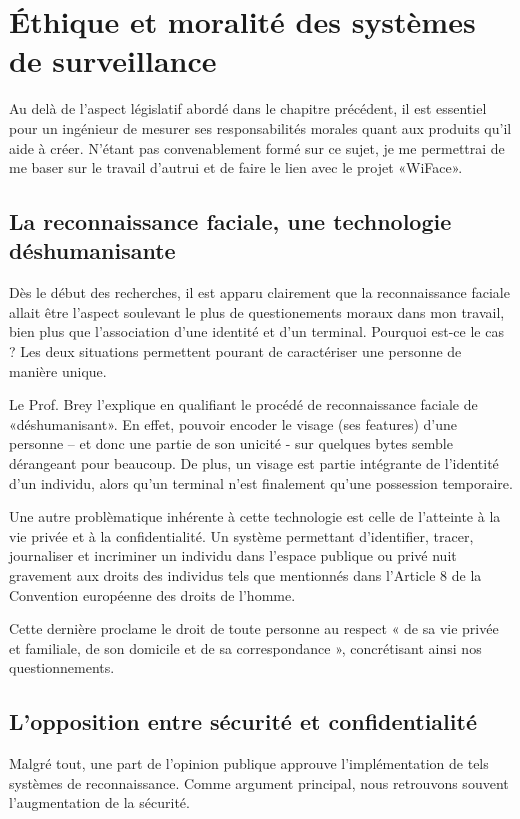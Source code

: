 \chapter{Éthique et moralité des systèmes de surveillance}
\label{ch:etudemoralite}

Au delà de l’aspect législatif abordé dans le chapitre précédent, il est essentiel pour un ingénieur de mesurer ses
responsabilités morales quant aux produits qu’il aide à créer. N’étant pas convenablement formé sur ce sujet, je
me permettrai de me baser sur le travail d’autrui et de faire le lien avec le projet «WiFace».

\section{La reconnaissance faciale, une technologie déshumanisante}
Dès le début des recherches, il est apparu clairement que la reconnaissance faciale allait être l’aspect soulevant le
plus de questionements moraux dans mon travail, bien plus que l’association d’une identité et d’un terminal.
Pourquoi est-ce le cas ? Les deux situations permettent pourant de caractériser une personne de manière unique.

Le Prof. Brey l’explique en qualifiant le procédé de reconnaissance faciale de «déshumanisant». En effet, pouvoir
encoder le visage (ses features) d’une personne – et donc une partie de son unicité - sur quelques bytes semble
dérangeant pour beaucoup. De plus, un visage est partie intégrante de l’identité d’un individu, alors qu’un terminal
n’est finalement qu’une possession temporaire.

Une autre problèmatique inhérente à cette technologie est celle de l’atteinte à la vie privée et à la confidentialité.
Un système permettant d’identifier, tracer, journaliser et incriminer un individu dans l’espace publique ou privé
nuit gravement aux droits des individus tels que mentionnés dans l’Article 8 de la Convention européenne des droits
de l’homme.

Cette dernière proclame le droit de toute personne au respect « de sa vie privée et familiale, de son domicile et de
sa correspondance », concrétisant ainsi nos questionnements.

\section{L’opposition entre sécurité et confidentialité}
Malgré tout, une part de l’opinion publique approuve l’implémentation de tels systèmes de reconnaissance.
Comme argument principal, nous retrouvons souvent l’augmentation de la sécurité.


